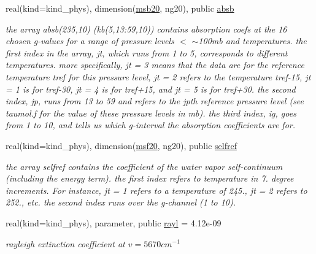 \begin{Indent}
\begin{DoxyCompactItemize}
real(kind=kind\+\_\+phys), dimension(\hyperlink{group__module__radsw__kgbnn_ga385f5b8c61ed1de7aa3bbb6bd65f522f}{msb20}, ng20), public \hyperlink{group__module__radsw__kgbnn_gaf5b135f82f34831e86a12f726cbe47ad}{absb}
\begin{DoxyCompactList}\small\item\em the array absb(235,10) (kb(5,13\+:59,10)) contains absorption coefs at the 16 chosen g-\/values for a range of pressure levels $<$ $\sim$100mb and temperatures. the first index in the array, jt, which runs from 1 to 5, corresponds to different temperatures. more specifically, jt = 3 means that the data are for the reference temperature tref for this pressure level, jt = 2 refers to the temperature tref-\/15, jt = 1 is for tref-\/30, jt = 4 is for tref+15, and jt = 5 is for tref+30. the second index, jp, runs from 13 to 59 and refers to the jpth reference pressure level (see taumol.\+f for the value of these pressure levels in mb). the third index, ig, goes from 1 to 10, and tells us which g-\/interval the absorption coefficients are for. \end{DoxyCompactList}\item 
real(kind=kind\+\_\+phys), dimension(\hyperlink{group__module__radsw__kgbnn_ga925dc2da02eef4edcf000a14525a7c7e}{msf20}, ng20), public \hyperlink{group__module__radsw__kgbnn_gaa3853af5e29277f9ed2bdd397cab5029}{selfref}
\begin{DoxyCompactList}\small\item\em the array selfref contains the coefficient of the water vapor self-\/continuum (including the energy term). the first index refers to temperature in 7. degree increments. For instance, jt = 1 refers to a temperature of 245., jt = 2 refers to 252., etc. the second index runs over the g-\/channel (1 to 10). \end{DoxyCompactList}\item 
real(kind=kind\+\_\+phys), parameter, public \hyperlink{group__module__radsw__kgbnn_ga6a00db6ce81c299d44ef5eadc1fe3b5b}{rayl} = 4.\+12e-\/09
\begin{DoxyCompactList}\small\item\em rayleigh extinction coefficient at $v=5670cm^{-1}$ \end{DoxyCompactList}\end{DoxyCompactItemize}
\end{Indent}
